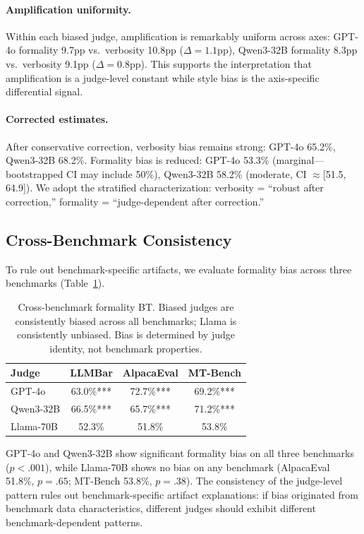 \documentclass[11pt]{article}
\begin{document}
\paragraph{Amplification uniformity.} Within each biased judge, amplification is remarkably uniform across axes: GPT-4o formality 9.7pp vs.\ verbosity 10.8pp ($\Delta=1.1$pp), Qwen3-32B formality 8.3pp vs.\ verbosity 9.1pp ($\Delta=0.8$pp). This supports the interpretation that amplification is a judge-level constant while style bias is the axis-specific differential signal.

\paragraph{Corrected estimates.} After conservative correction, verbosity bias remains strong: GPT-4o 65.2\%, Qwen3-32B 68.2\%. Formality bias is reduced: GPT-4o 53.3\% (marginal---bootstrapped CI may include 50\%), Qwen3-32B 58.2\% (moderate, CI $\approx$[51.5, 64.9]). We adopt the stratified characterization: verbosity = ``robust after correction,'' formality = ``judge-dependent after correction.''

\subsection{Cross-Benchmark Consistency}
\label{sec:cross_bench}

To rule out benchmark-specific artifacts, we evaluate formality bias across three benchmarks (Table~\ref{tab:crossbench}).

\begin{table}[t]
\centering
\small
\begin{tabular}{lccc}
\toprule
\textbf{Judge} & \textbf{LLMBar} & \textbf{AlpacaEval} & \textbf{MT-Bench} \\
\midrule
GPT-4o & 63.0\%*** & 72.7\%*** & 69.2\%*** \\
Qwen3-32B & 66.5\%*** & 65.7\%*** & 71.2\%*** \\
Llama-70B & 52.3\% & 51.8\% & 53.8\% \\
\bottomrule
\end{tabular}
\caption{Cross-benchmark formality BT. Biased judges are consistently biased across all benchmarks; Llama is consistently unbiased. Bias is determined by judge identity, not benchmark properties.}
\label{tab:crossbench}
\end{table}

GPT-4o and Qwen3-32B show significant formality bias on all three benchmarks ($p < .001$), while Llama-70B shows no bias on any benchmark (AlpacaEval 51.8\%, $p=.65$; MT-Bench 53.8\%, $p=.38$). The consistency of the judge-level pattern rules out benchmark-specific artifact explanations: if bias originated from benchmark data characteristics, different judges should exhibit different benchmark-dependent patterns.
\end{document}
